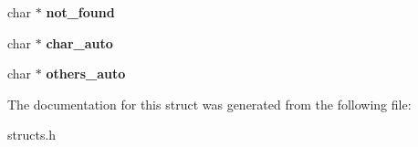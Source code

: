 \begin{DoxyCompactItemize}
\item 
\hypertarget{structsocial__data_af70dc6853546bea3ef1262408de33344}{char $\ast$ {\bfseries not\-\_\-found}}\label{structsocial__data_af70dc6853546bea3ef1262408de33344}

\item 
\hypertarget{structsocial__data_ae2fb50f15489ee289e2f348c39968676}{char $\ast$ {\bfseries char\-\_\-auto}}\label{structsocial__data_ae2fb50f15489ee289e2f348c39968676}

\item 
\hypertarget{structsocial__data_a899d804a80721c480bf8f997e9fa8453}{char $\ast$ {\bfseries others\-\_\-auto}}\label{structsocial__data_a899d804a80721c480bf8f997e9fa8453}

\end{DoxyCompactItemize}


The documentation for this struct was generated from the following file\-:\begin{DoxyCompactItemize}
\item 
structs.\-h\end{DoxyCompactItemize}
